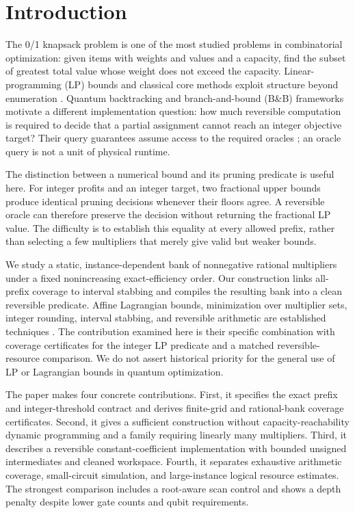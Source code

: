 \documentclass[referee,pdflatex,sn-mathphys-num]{sn-jnl}
\theoremstyle{thmstyleone}
\theoremstyle{thmstyletwo}
\begin{document}
\section{Introduction}\label{sec:intro}
The 0/1 knapsack problem is one of the most studied problems in combinatorial optimization: given items with weights and values and a capacity, find the subset of greatest total value whose weight does not exceed the capacity. Linear-programming (LP) bounds and classical core methods exploit structure beyond enumeration \cite{ref1,ref3,balas1980core}. Quantum backtracking and branch-and-bound (B\&B) frameworks motivate a different implementation question: how much reversible computation is required to decide that a partial assignment cannot reach an integer objective target? Their query guarantees assume access to the required oracles \cite{ref35,ref24}; an oracle query is not a unit of physical runtime.

The distinction between a numerical bound and its pruning predicate is useful here. For integer profits and an integer target, two fractional upper bounds produce identical pruning decisions whenever their floors agree. A reversible oracle can therefore preserve the decision without returning the fractional LP value. The difficulty is to establish this equality at every allowed prefix, rather than selecting a few multipliers that merely give valid but weaker bounds.

We study a static, instance-dependent bank of nonnegative rational multipliers under a fixed nonincreasing exact-efficiency order. Our construction links all-prefix coverage to interval stabbing and compiles the resulting bank into a clean reversible predicate. Affine Lagrangian bounds, minimization over multiplier sets, integer rounding, interval stabbing, and reversible arithmetic are established techniques \cite{bozejko2026,erickson2019algorithms,vedral1996,draper2000}. The contribution examined here is their specific combination with coverage certificates for the integer LP predicate and a matched reversible-resource comparison. We do not assert historical priority for the general use of LP or Lagrangian bounds in quantum optimization.

The paper makes four concrete contributions. First, it specifies the exact prefix and integer-threshold contract and derives finite-grid and rational-bank coverage certificates. Second, it gives a sufficient construction without capacity-reachability dynamic programming and a family requiring linearly many multipliers. Third, it describes a reversible constant-coefficient implementation with bounded unsigned intermediates and cleaned workspace. Fourth, it separates exhaustive arithmetic coverage, small-circuit simulation, and large-instance logical resource estimates. The strongest comparison includes a root-aware scan control and shows a depth penalty despite lower gate counts and qubit requirements.
\end{document}
